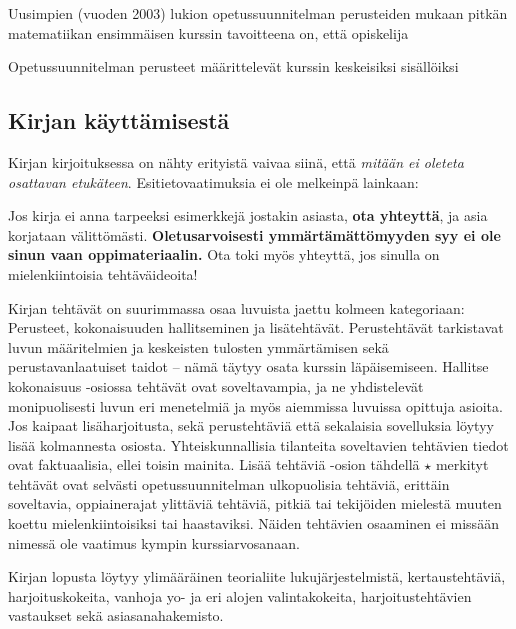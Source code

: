 Uusimpien (vuoden 2003) lukion opetussuunnitelman perusteiden mukaan pitkän matematiikan ensimmäisen kurssin tavoitteena on, että opiskelija

Opetussuunnitelman perusteet määrittelevät kurssin keskeisiksi sisällöiksi


\newpage

\subsection*{Kirjan käyttämisestä}

Kirjan kirjoituksessa on nähty erityistä vaivaa siinä, että \textit{mitään ei oleteta osattavan etukäteen}. Esitietovaatimuksia ei ole melkeinpä lainkaan:


Jos kirja ei anna tarpeeksi esimerkkejä jostakin asiasta, \textbf{ota yhteyttä}, ja asia korjataan välittömästi. \textbf{Oletusarvoisesti ymmärtämättömyyden syy ei ole sinun vaan oppimateriaalin.} Ota toki myös yhteyttä, jos sinulla on mielenkiintoisia tehtäväideoita!

Kirjan tehtävät on suurimmassa osaa luvuista jaettu kolmeen kategoriaan: Perusteet, kokonaisuuden hallitseminen ja lisätehtävät. Perustehtävät tarkistavat luvun määritelmien ja keskeisten tulosten ymmärtämisen sekä perustavanlaatuiset taidot -- nämä täytyy osata kurssin läpäisemiseen. Hallitse kokonaisuus -osiossa tehtävät ovat soveltavampia, ja ne yhdistelevät monipuolisesti luvun eri menetelmiä ja myös aiemmissa luvuissa opittuja asioita. Jos kaipaat lisäharjoitusta, sekä perustehtäviä että sekalaisia sovelluksia löytyy lisää kolmannesta osiosta. Yhteiskunnallisia tilanteita soveltavien tehtävien tiedot ovat faktuaalisia, ellei toisin mainita. Lisää tehtäviä -osion tähdellä $\star$ merkityt tehtävät ovat selvästi opetussuunnitelman ulkopuolisia tehtäviä, erittäin soveltavia, oppiainerajat ylittäviä tehtäviä, pitkiä tai tekijöiden mielestä muuten koettu mielenkiintoisiksi tai haastaviksi. Näiden tehtävien osaaminen ei missään nimessä ole vaatimus kympin kurssiarvosanaan.

Kirjan lopusta löytyy ylimääräinen teorialiite lukujärjestelmistä, kertaustehtäviä, harjoituskokeita, vanhoja yo- ja eri alojen valintakokeita, harjoitustehtävien vastaukset sekä asiasanahakemisto.

\newpage